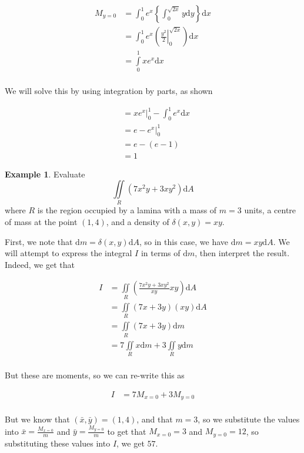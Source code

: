 \documentclass[11pt]{article}
\theoremstyle{plain} %
\theoremstyle{definition}
\theoremstyle{example}
\newtheorem*{example}{Example}
\theoremstyle{remark}
\begin{document}
\begin{align*}
M_{y=0} &= \int_0^1 e^x \left\{ \int_0^{\sqrt{2x}} y \mathrm d y  \right\} \mathrm d x\\
	&= \int_0^1e^x \left(\left.\frac{y^2}{2}\right|_0^{\sqrt{2x}}\right)\mathrm d x\\
	&= \int \limits_0^1 xe^x \mathrm d x \\
\end{align*}

We will solve this by using integration by parts, as shown

\begin{align*}
&= \left.xe^x\right|_0^1-\int_0^1e^x\mathrm d x\\
&= e-\left.e^x\right|_0^1\\
&= e - (e-1)\\
&= 1
\end{align*}

\begin{example}
Evaluate $$\iint \limits_R \left(7x^2 y +3xy^2 \right) \mathrm d A$$ where $R$ is the region occupied by a lamina with a mass of $m=3$ units, a centre of mass at the point $(1,4)$, and a density of $\delta (x,y) =xy$. 
\end{example}


First, we note that $\mathrm d m = \delta (x,y) \mathrm d A$, so in this case, we have $\mathrm d m = xy \mathrm d A$. We will attempt to express the integral $I$ in terms of $\mathrm d m$, then interpret the result. Indeed, we get that 

\begin{align*}
	I &= \iint \limits_R \left( \frac{7x^2y+3xy^2}{xy} xy\right) \mathrm d A\\
	&= \iint \limits_R \left(7x+3y \right)(xy) \mathrm d A \\
	&= \iint \limits_R (7x+3y) \mathrm d m\\
	&= 7 \iint \limits_R x \mathrm d m + 3 \iint \limits_R y \mathrm d m \\
\end{align*}

But these are moments, so we can re-write this as 

\begin{align*}
	I &= 7 M_{x=0} + 3 M_{y=0} \\
\end{align*}

But we know that $(\bar{x}, \bar{y}) = (1, 4)$, and that $m=3$, so we substitute the values into $\bar{x} = \frac{M_{x=0}}{m}$ and $\bar{y} = \frac{M_{y=0}}{m}$ to get that $M_{x=0} = 3$ and $M_{y=0} = 12$, so substituting these values into $I$, we get $57$.
\end{document}
